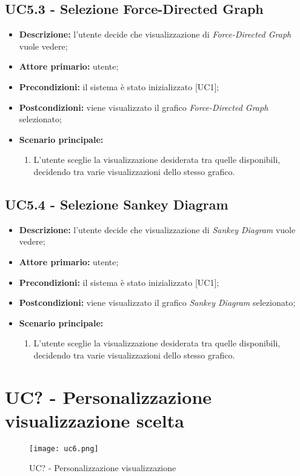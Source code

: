 \subsection{UC5.3 - Selezione Force-Directed Graph}
\begin{itemize}
    \item \textbf{Descrizione:} l'utente decide che visualizzazione di \textit{Force-Directed Graph} vuole vedere;
    \item \textbf{Attore primario:} utente;
    \item \textbf{Precondizioni:} il sistema è stato inizializzato [UC1];
    \item \textbf{Postcondizioni:} viene visualizzato il grafico \textit{Force-Directed Graph} selezionato;
    \item \textbf{Scenario principale:}
    \begin{enumerate}
      \item L'utente sceglie la visualizzazione desiderata tra quelle disponibili, decidendo tra varie visualizzazioni dello stesso grafico.
    \end{enumerate}
\end{itemize}

\subsection{UC5.4 - Selezione Sankey Diagram}
\begin{itemize}
    \item \textbf{Descrizione:} l'utente decide che visualizzazione di \textit{Sankey Diagram} vuole vedere;
    \item \textbf{Attore primario:} utente;
    \item \textbf{Precondizioni:} il sistema è stato inizializzato [UC1];
    \item \textbf{Postcondizioni:} viene visualizzato il grafico \textit{Sankey Diagram} selezionato;
    \item \textbf{Scenario principale:}
    \begin{enumerate}
      \item L'utente sceglie la visualizzazione desiderata tra quelle disponibili, decidendo tra varie visualizzazioni dello stesso grafico.
    \end{enumerate}
\end{itemize}


\section{UC? - Personalizzazione visualizzazione scelta}
\begin{figure}[H]
  \centering
  \texttt{[image: uc6.png]}
  \caption{UC? - Personalizzazione visualizzazione}
\end{figure}

